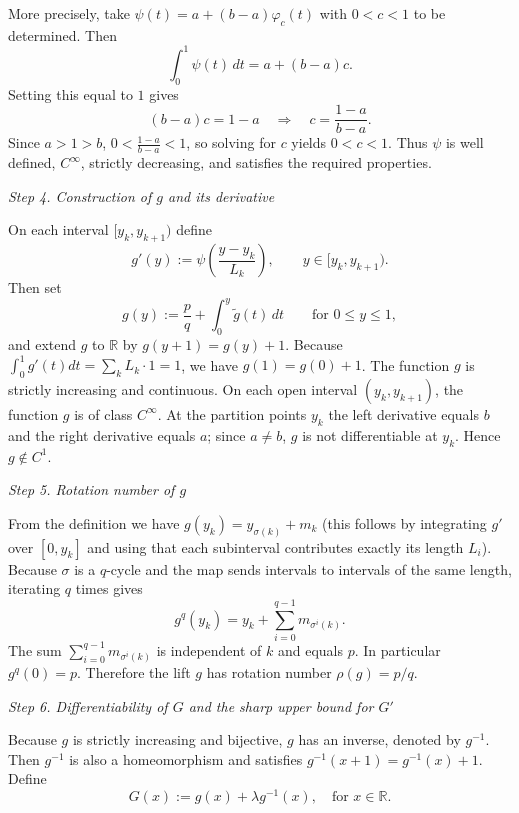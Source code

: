 \documentclass{amsart}
\begin{document}
	More precisely, take $\psi(t)=a+(b-a)\varphi_c(t)$ with $0<c<1$ to be determined. Then
	\[
	\int_0^1\psi(t)\,dt = a + (b-a)c.
	\]
	Setting this equal to $1$ gives
	\[
	(b-a)c=1-a\quad\Longrightarrow\quad c=\frac{1-a}{b-a}.
	\]
	Since $a>1>b$, $0<\frac{1-a}{b-a}<1$, so solving for $c$ yields $0<c<1$. Thus $\psi$ is well defined, $C^\infty$, strictly decreasing, and satisfies the required properties.
	
	\vspace{1ex}
	
	\textit{Step 4. Construction of $g$ and its derivative}
	
	On each interval $[y_k,y_{k+1})$ define
	\begin{equation}
		g'(y):=\psi\!\left(\frac{y-y_k}{L_k}\right),\qquad y\in[y_k,y_{k+1}).
	\end{equation}
	Then set
	\begin{equation}
		g(y):=\frac{p}{q}+\int_0^y \tilde{g}(t)\,dt\qquad\text{for }0\le y\le1,
	\end{equation}
	and extend $g$ to $\mathbb{R}$ by $g(y+1)=g(y)+1$. Because $\int_0^1 g'(t)dt=\sum_k L_k\cdot1=1$, we have $g(1)=g(0)+1$. The function $g$ is strictly increasing and continuous. On each open interval $(y_k,y_{k+1})$, the function $g$ is of class $C^\infty$. At the partition points $y_k$ the left derivative equals $b$ and the right derivative equals $a$; since $a\neq b$, $g$ is not differentiable at $y_k$. Hence $g\notin C^1$.
	
	\vspace{1ex}
	
	\textit{Step 5. Rotation number of $g$}
	
	From the definition we have $g(y_k)=y_{\sigma(k)}+m_k$ (this follows by integrating $g'$ over $[0,y_k]$ and using that each subinterval contributes exactly its length $L_i$). Because $\sigma$ is a $q$-cycle and the map sends intervals to intervals of the same length, iterating $q$ times gives
	\[
	g^q(y_k)=y_k+\sum_{i=0}^{q-1}m_{\sigma^i(k)}.
	\]
	The sum $\sum_{i=0}^{q-1}m_{\sigma^i(k)}$ is independent of $k$ and equals $p$. In particular $g^q(0)=p$. Therefore the lift $g$ has rotation number $\rho(g)=p/q$.
	
	\vspace{1ex}
	
	\textit{Step 6. Differentiability of $G$ and the sharp upper bound for $G'$}
	
	Because $g$ is strictly increasing and bijective, $g$ has an inverse, denoted by $g^{-1}$. Then $g^{-1}$ is also a homeomorphism and satisfies $g^{-1}(x+1)=g^{-1}(x)+1$. Define
	\[
	G(x):=g(x)+\lambda g^{-1}(x),\quad \text{for } x\in \mathbb{R}.
	\]
	
\end{document}
